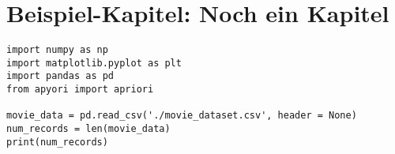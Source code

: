 \chapter{Beispiel-Kapitel: Noch ein Kapitel}



\begin{lstlisting}[caption={\texttt{PrintMovieDB.py}},captionpos=b]
import numpy as np  
import matplotlib.pyplot as plt  
import pandas as pd  
from apyori import apriori

movie_data = pd.read_csv('./movie_dataset.csv', header = None)
num_records = len(movie_data)
print(num_records)
\end{lstlisting}
